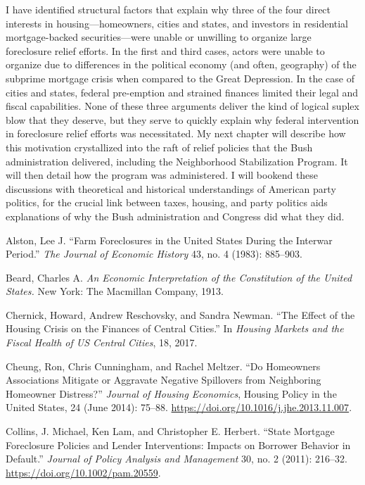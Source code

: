 \documentclass[
]{article}
\begin{document}
I have identified structural factors that explain why three of the four
direct interests in housing---homeowners, cities and states, and
investors in residential mortgage-backed securities---were unable or
unwilling to organize large foreclosure relief efforts. In the first and
third cases, actors were unable to organize due to differences in the
political economy (and often, geography) of the subprime mortgage crisis
when compared to the Great Depression. In the case of cities and states,
federal pre-emption and strained finances limited their legal and fiscal
capabilities. None of these three arguments deliver the kind of logical
suplex blow that they deserve, but they serve to quickly explain why
federal intervention in foreclosure relief efforts was necessitated. My
next chapter will describe how this motivation crystallized into the
raft of relief policies that the Bush administration delivered,
including the Neighborhood Stabilization Program. It will then detail
how the program was administered. I will bookend these discussions with
theoretical and historical understandings of American party politics,
for the crucial link between taxes, housing, and party politics aids
explanations of why the Bush administration and Congress did what they
did.

\hypertarget{refs}{}
\leavevmode\hypertarget{ref-alston1983farm}{}%
Alston, Lee J. ``Farm Foreclosures in the United States During the
Interwar Period.'' \emph{The Journal of Economic History} 43, no. 4
(1983): 885--903.

\leavevmode\hypertarget{ref-beardEconomicInterpretationConstitution1913}{}%
Beard, Charles A. \emph{An Economic Interpretation of the Constitution
of the United States.} New York: The Macmillan Company, 1913.

\leavevmode\hypertarget{ref-chernick2017effect}{}%
Chernick, Howard, Andrew Reschovsky, and Sandra Newman. ``The Effect of
the Housing Crisis on the Finances of Central Cities.'' In \emph{Housing
Markets and the Fiscal Health of US Central Cities}, 18, 2017.

\leavevmode\hypertarget{ref-cheung2014homeowners}{}%
Cheung, Ron, Chris Cunningham, and Rachel Meltzer. ``Do Homeowners
Associations Mitigate or Aggravate Negative Spillovers from Neighboring
Homeowner Distress?'' \emph{Journal of Housing Economics}, Housing
Policy in the United States, 24 (June 2014): 75--88.
\url{https://doi.org/10.1016/j.jhe.2013.11.007}.

\leavevmode\hypertarget{ref-collins2011state}{}%
Collins, J. Michael, Ken Lam, and Christopher E. Herbert. ``State
Mortgage Foreclosure Policies and Lender Interventions: Impacts on
Borrower Behavior in Default.'' \emph{Journal of Policy Analysis and
Management} 30, no. 2 (2011): 216--32.
\url{https://doi.org/10.1002/pam.20559}.
\end{document}
